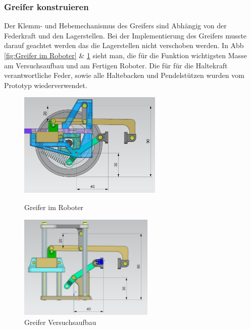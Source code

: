\subsubsection{Greifer konstruieren}
\label{Greifer konstruieren}

Der Klemm- und Hebemechanismus des Greifers sind Abhängig von der Federkraft und den Lagerstellen. Bei der Implementierung des Greifers musste darauf geachtet werden das die Lagerstellen nicht verschoben werden. In Abb \ref{fig:Greifer im Roboter} \& \ref{fig:Greifer Versuchsaufbau} sieht man, die für die Funktion wichtigsten Masse am Versuchsaufbau und am Fertigen Roboter. Die für für die Haltekraft verantwortliche Feder, sowie alle Haltebacken und Pendelstützen wurden vom Prototyp wiederverwendet. 

\begin{figure}[H]
  \centering
  \begin{minipage}[b]{0.45\textwidth}
    \centering
    \includegraphics[height=5cm]{assets/MT/Greifer Montiert.png}
    \caption{Greifer im Roboter}
    \label{fig:Greifer im Roboter}
  \end{minipage}
  \hfill
  \begin{minipage}[b]{0.45\textwidth}
    \centering
    \includegraphics[height=5cm]{assets/MT/Greifer Prototyp.png}
    \caption{Greifer Versuchsaufbau}
    \label{fig:Greifer Versuchsaufbau}
  \end{minipage}
\end{figure}






